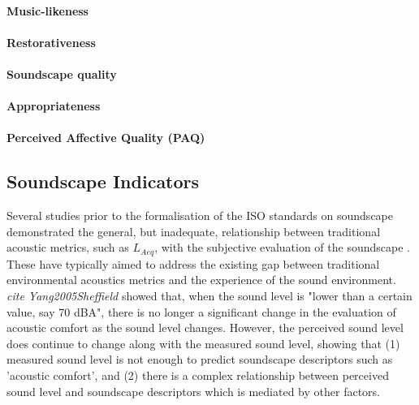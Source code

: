     \paragraph{Music-likeness}

    \paragraph{Restorativeness}

    \paragraph{Soundscape quality}

    \paragraph{Appropriateness}

    \paragraph{Perceived Affective Quality (PAQ)}

  \subsection{Soundscape Indicators}
    Several studies prior to the formalisation of the ISO standards on soundscape demonstrated the general, but inadequate, relationship between traditional acoustic metrics, such as $L_{Aeq}$, with the subjective evaluation of the soundscape \cite{Berglund2006a, Yang2005b,  Aumond2017, Alsina-Pages2020}.
    These have typically aimed to address the existing gap between traditional environmental acoustics metrics and the experience of the sound environment. \emph{cite Yang2005Sheffield} showed that, when the sound level is "lower than a certain value, say 70 dBA", there is no longer a significant change in the evaluation of acoustic comfort as the sound level changes. However, the perceived sound level does continue to change along with the measured sound level, showing that (1) measured sound level is not enough to predict soundscape descriptors such as 'acoustic comfort', and (2) there is a complex relationship between perceived sound level and soundscape descriptors which is mediated by other factors.

